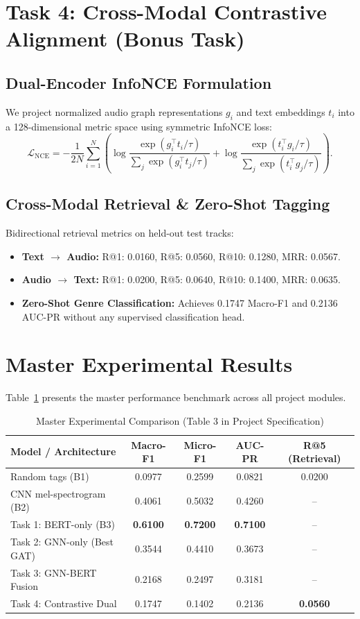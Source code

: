 \documentclass{article}
\begin{document}
\section{Task 4: Cross-Modal Contrastive Alignment (Bonus Task)}
\subsection{Dual-Encoder InfoNCE Formulation}
We project normalized audio graph representations $g_i$ and text embeddings $t_i$ into a 128-dimensional metric space using symmetric InfoNCE loss:
$$\mathcal{L}_{\text{NCE}} = -\frac{1}{2N}\sum_{i=1}^N \left( \log \frac{\exp(g_i^\top t_i / \tau)}{\sum_j \exp(g_i^\top t_j / \tau)} + \log \frac{\exp(t_i^\top g_i / \tau)}{\sum_j \exp(t_i^\top g_j / \tau)} \right).$$

\subsection{Cross-Modal Retrieval \& Zero-Shot Tagging}
Bidirectional retrieval metrics on held-out test tracks:
\begin{itemize}
    \item \textbf{Text $\to$ Audio:} R@1: 0.0160, R@5: 0.0560, R@10: 0.1280, MRR: 0.0567.
    \item \textbf{Audio $\to$ Text:} R@1: 0.0200, R@5: 0.0640, R@10: 0.1400, MRR: 0.0635.
    \item \textbf{Zero-Shot Genre Classification:} Achieves 0.1747 Macro-F1 and 0.2136 AUC-PR without any supervised classification head.
\end{itemize}

\section{Master Experimental Results}
Table~\ref{tab:master} presents the master performance benchmark across all project modules.

\begin{table}[t]
\caption{Master Experimental Comparison (Table 3 in Project Specification)}
\centering
\begin{tabular}{lcccc}
\toprule
\textbf{Model / Architecture} & \textbf{Macro-F1} & \textbf{Micro-F1} & \textbf{AUC-PR} & \textbf{R@5 (Retrieval)} \\
\midrule
Random tags (B1) & 0.0977 & 0.2599 & 0.0821 & 0.0200 \\
CNN mel-spectrogram (B2) & 0.4061 & 0.5032 & 0.4260 & -- \\
Task 1: BERT-only (B3) & \textbf{0.6100} & \textbf{0.7200} & \textbf{0.7100} & -- \\
Task 2: GNN-only (Best GAT) & 0.3544 & 0.4410 & 0.3673 & -- \\
Task 3: GNN-BERT Fusion & 0.2168 & 0.2497 & 0.3181 & -- \\
Task 4: Contrastive Dual & 0.1747 & 0.1402 & 0.2136 & \textbf{0.0560} \\
\bottomrule
\end{tabular}
\label{tab:master}
\end{table}
\end{document}
